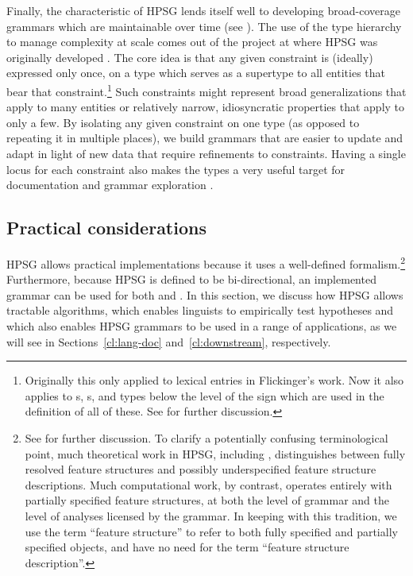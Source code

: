 \documentclass[output=paper
 	        ,biblatex
                ,babelshorthands
                ,newtxmath
                ,draftmode
                ,colorlinks, citecolor=brown
]{langscibook}
\begin{document}
\largerpage
Finally, the  characteristic of HPSG lends itself well
to developing broad-coverage grammars which are
maintainable over time (see \citealt{Syg:Win:11}).
The use of the type hierarchy to manage complexity at scale
comes out of the project at  where HPSG was originally developed
\citep{FPW85a,Flickinger87}.
The core idea is that any given constraint is (ideally) expressed only once,
on a type which serves as a supertype to all entities that bear that constraint.\footnote{%
    Originally this only applied to lexical entries in Flickinger's work.
    Now it also applies to s, s,
    and types below the level of the sign which are used in the definition of all of these.
    See 
    for further discussion.
}
Such constraints might represent broad generalizations that apply to many entities
or relatively narrow, idiosyncratic properties that apply to only a few.
By isolating any given constraint on one type (as opposed to repeating it in multiple places),
we build grammars that are easier to update and adapt in light of
new data that require refinements to constraints.
Having a single locus for each constraint also makes the types a very useful target
for documentation \citep{Hashimoto-etal:07}
and grammar exploration \citep{Letcher:18}. 


\subsection{Practical considerations}
\label{cl:prac}

\largerpage
HPSG allows practical implementations because it uses a well-defined formalism.\footnote{\label{cl:fn-feature-structure}%
    See  for further discussion.
    To clarify a potentially confusing terminological point,
    much theoretical work in HPSG, including \citet{ps2},
    distinguishes between fully resolved feature structures
    and possibly underspecified feature structure descriptions.
    Much computational work, by contrast, operates entirely with partially specified feature structures,
    at both the level of grammar and the level of analyses licensed by the grammar.
    In keeping with this tradition, we use the term
    ``feature structure'' to refer to both fully specified and partially specified objects,
    and have no need for the term ``feature structure description''.
}
Furthermore, because HPSG is defined to be bi-directional,
an implemented grammar can be used for both  and .
In this section, we discuss how HPSG allows tractable algorithms,
which enables linguists to empirically test hypotheses
and which also enables HPSG grammars to be used in a range of applications,
as we will see in Sections~\ref{cl:lang-doc} and~\ref{cl:downstream}, respectively.
\end{document}
